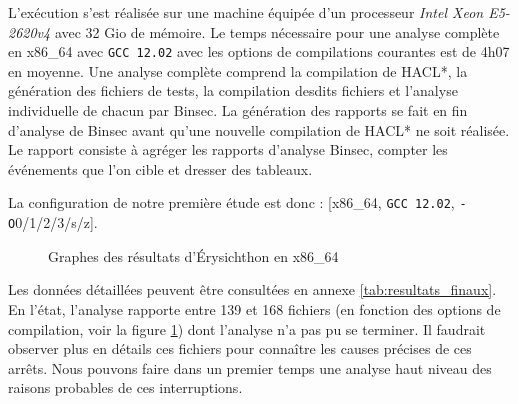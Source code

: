 L'exécution s'est réalisée sur une machine équipée d'un processeur \textit{Intel Xeon E5-2620v4} avec 32 Gio de mémoire. Le temps nécessaire pour une analyse complète en x86\_64 avec \texttt{GCC 12.02} avec les options de compilations courantes est de 4h07 en moyenne. Une analyse complète comprend la compilation de HACL*, la génération des fichiers de tests, la compilation desdits fichiers et l'analyse individuelle de chacun par Binsec. La génération des rapports se fait en fin d'analyse de Binsec avant qu'une nouvelle compilation de HACL* ne soit réalisée. Le rapport consiste à agréger les rapports d'analyse Binsec, compter les événements que l'on cible et dresser des tableaux.\medbreak

La configuration de notre première étude est donc : [x86\_64, \texttt{GCC 12.02}, \texttt{-O}0/1/2/3/s/z].\medbreak

\begin{figure}[!ht]
  \centering
  \caption{Graphes des résultats d'Érysichthon en x86\_64}
  \label{fig:graphe_total}
\end{figure}


Les données détaillées peuvent être consultées en annexe \ref{tab:resultats_finaux}. En l'état, l'analyse rapporte entre 139 et 168 fichiers (en fonction des options de compilation, voir la figure \ref{fig:graphe_total}) dont l'analyse n'a pas pu se terminer. Il faudrait observer plus en détails ces fichiers pour connaître les causes précises de ces arrêts. Nous pouvons faire dans un premier temps une analyse haut niveau des raisons probables de ces interruptions. \medbreak

